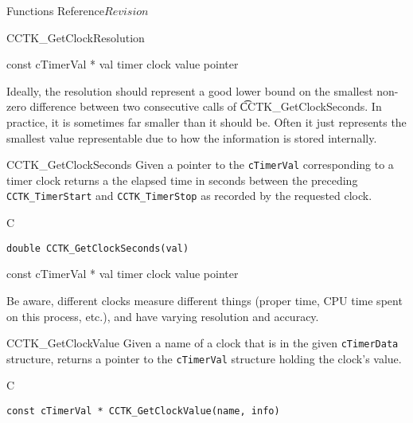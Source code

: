 \begin{cactuspart}{ Functions Reference}{}{$Revision$}
\begin{FunctionDescription}{CCTK\_GetClockResolution}
\begin{ParameterSection}
\begin{Parameter}{const cTimerVal * val}
timer clock value pointer
\end{Parameter}
\end{ParameterSection}

\begin{Discussion}
Ideally, the resolution should represent a good lower bound on the smallest
non-zero difference between two consecutive calls of {\t CCTK\_GetClockSeconds}.
In practice, it is sometimes far smaller than it should be.  Often it just
represents the smallest value representable due to how the information is
stored internally.
\end{Discussion}
\end{FunctionDescription}



\begin{FunctionDescription}{CCTK\_GetClockSeconds}
\label{CCTK-GetClockSeconds}
Given a pointer to the {\tt cTimerVal}
corresponding to a timer clock returns a the elapsed time in seconds between
the preceding {\tt CCTK\_TimerStart} and {\tt CCTK\_TimerStop} as recorded
by the requested clock.

\begin{SynopsisSection}
\begin{Synopsis}{C}
\begin{verbatim}
double CCTK_GetClockSeconds(val)
\end{verbatim}
\end{Synopsis}
\end{SynopsisSection}

\begin{ParameterSection}
\begin{Parameter}{const cTimerVal * val}
timer clock value pointer
\end{Parameter}
\end{ParameterSection}

\begin{Discussion}
Be aware, different clocks measure different things (proper time,
CPU time spent on this process, etc.), and have varying resolution
and accuracy.
\end{Discussion}
\end{FunctionDescription}


\begin{FunctionDescription}{CCTK\_GetClockValue}
\label{CCTK-GetClockValue}
Given a name of a clock that is
in the given {\tt cTimerData} structure,
returns a pointer to the {\tt cTimerVal} structure holding the clock's value.
\begin{SynopsisSection}
\begin{Synopsis}{C}
\begin{verbatim}
const cTimerVal * CCTK_GetClockValue(name, info)
\end{verbatim}
\end{Synopsis}
\end{SynopsisSection}


\end{FunctionDescription}
\end{cactuspart}
